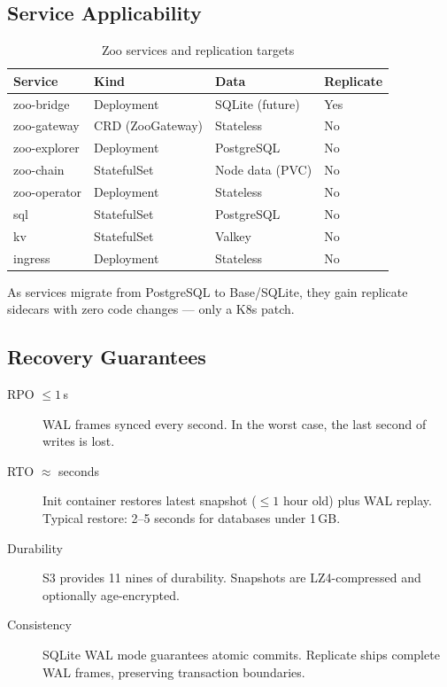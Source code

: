 \subsection{Service Applicability}

\begin{table}[h]
\centering
\caption{Zoo services and replication targets}
\begin{tabular}{@{}llll@{}}
\toprule
Service & Kind & Data & Replicate \\
\midrule
zoo-bridge & Deployment & SQLite (future) & Yes \\
zoo-gateway & CRD (ZooGateway) & Stateless & No \\
zoo-explorer & Deployment & PostgreSQL & No \\
zoo-chain & StatefulSet & Node data (PVC) & No\footnotemark \\
zoo-operator & Deployment & Stateless & No \\
sql & StatefulSet & PostgreSQL & No \\
kv & StatefulSet & Valkey & No \\
ingress & Deployment & Stateless & No \\
\bottomrule
\end{tabular}
\end{table}

As services migrate from PostgreSQL to Base/SQLite, they gain
replicate sidecars with zero code changes --- only a K8s patch.

\subsection{Recovery Guarantees}

\begin{description}
\item[RPO $\leq 1$\,s] WAL frames synced every second.
  In the worst case, the last second of writes is lost.

\item[RTO $\approx$ seconds] Init container restores latest
  snapshot ($\leq 1$ hour old) plus WAL replay.  Typical
  restore: 2--5 seconds for databases under 1\,GB.

\item[Durability] S3 provides 11 nines of durability.
  Snapshots are LZ4-compressed and optionally age-encrypted.

\item[Consistency] SQLite WAL mode guarantees atomic commits.
  Replicate ships complete WAL frames, preserving transaction
  boundaries.
\end{description}

